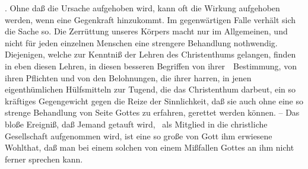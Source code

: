 \begin{aufza}
. Ohne daß die Ursache aufgehoben wird, kann oft die Wirkung aufgehoben werden, wenn eine Gegenkraft hinzukommt. Im gegenwärtigen Falle verhält sich die Sache so. Die Zerrüttung unseres Körpers macht nur im Allgemeinen, und nicht für jeden einzelnen Menschen eine strengere Behandlung nothwendig. Diejenigen, welche zur Kenntniß der Lehren des Christenthums gelangen, finden in eben diesen Lehren, in diesen besseren Begriffen von ihrer~\ Bestimmung, von ihren Pflichten und von den Belohnungen, die ihrer harren, in jenen eigenthümlichen Hülfsmitteln zur Tugend, die das Christenthum darbeut, ein so kräftiges Gegengewicht gegen die Reize der Sinnlichkeit, daß sie auch ohne eine so strenge Behandlung von Seite Gottes zu erfahren, gerettet werden können. -- Das bloße Ereigniß, daß Jemand getauft wird, \dh\ als Mitglied in die christliche Gesellschaft aufgenommen wird, ist eine so große von Gott ihm erwiesene Wohlthat, daß man bei einem solchen von einem Mißfallen Gottes an ihm nicht ferner sprechen kann.
\end{aufza}

